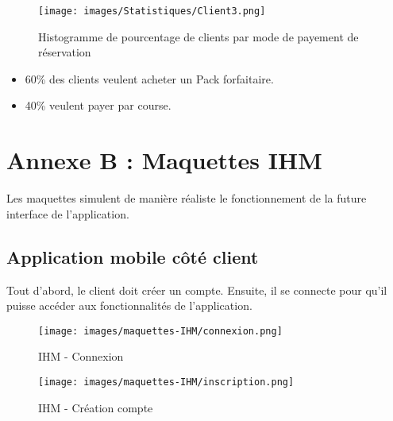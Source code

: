 {\begin{minipage}[c]{.6\linewidth}
\begin{figure}[H]
\centering
\texttt{[image: images/Statistiques/Client3.png]}
\caption{Histogramme de pourcentage de clients par mode de payement de réservation}
\end{figure}
 \end{minipage}\hfill
\begin{minipage}[c]{.4\linewidth}
\begin{itemize}
\item 60\% des clients veulent acheter un Pack forfaitaire.

\item 40\% veulent payer par course.
\end{itemize}
\end{minipage}






\newpage
{}
\section*{Annexe B : Maquettes IHM}
Les maquettes simulent de manière réaliste le fonctionnement de la future interface de l’application.

\subsection*{Application mobile côté client}
Tout d’abord, le client doit créer un compte. Ensuite, il se connecte pour qu’il puisse accéder aux fonctionnalités de l’application.


\begin{minipage}[c]{.46\linewidth}
\begin{figure}[H]
\centering
\texttt{[image: images/maquettes-IHM/connexion.png]}
\caption{IHM - Connexion}
\end{figure}

 \end{minipage}\hfill
\begin{minipage}[c]{.46\linewidth}
\begin{figure}[H]
\centering
\texttt{[image: images/maquettes-IHM/inscription.png]}
\caption{IHM - Création compte}
\end{figure}
\end{minipage}

}
